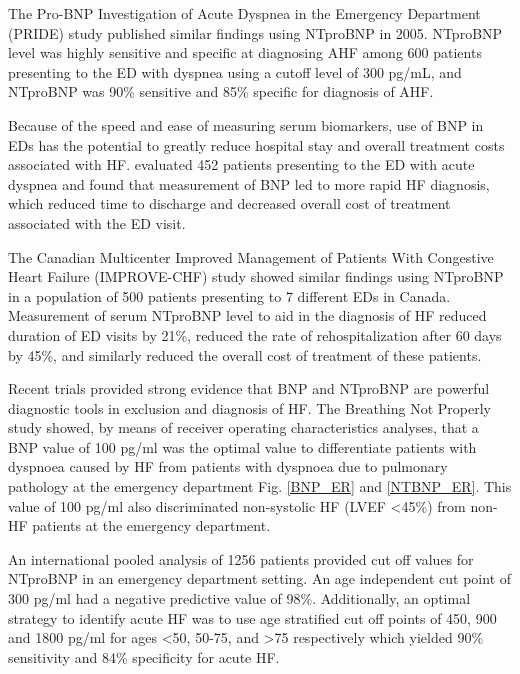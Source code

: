 \documentclass[14pt,a4paper,onecolumn]{extarticle}
\begin{document}
The Pro-BNP Investigation of Acute Dyspnea in the Emergency Department (PRIDE) study published similar findings using NTproBNP in 2005. NTproBNP level was highly sensitive and specific at diagnosing AHF among 600 patients presenting to the ED with dyspnea using a cutoff level of 300 pg/mL, and NTproBNP was 90\% sensitive and 85\% specific for diagnosis of AHF. \citep{Januzzi2005}  %

Because of the speed and ease of measuring serum biomarkers, use of BNP in EDs has the potential to greatly reduce hospital stay and overall treatment costs associated with HF. \citep{Mueller2004} evaluated 452 patients presenting to the ED with acute dyspnea and found that measurement of BNP led to more rapid HF diagnosis, which reduced time to discharge and decreased overall cost of treatment associated with the ED visit.  %

The Canadian Multicenter Improved Management of Patients With Congestive Heart Failure (IMPROVE-CHF) study showed similar findings using NTproBNP in a population of 500 patients presenting to 7 different EDs in Canada. Measurement of serum NTproBNP level to aid in the diagnosis of HF reduced duration of ED visits by 21\%, reduced the rate of rehospitalization after 60 days by 45\%, and similarly reduced the overall cost of treatment of these patients. \citep{Moe2007} %

Recent trials provided strong evidence that BNP and NTproBNP are powerful diagnostic tools in exclusion and diagnosis of HF. The Breathing Not Properly study showed, by means of receiver operating characteristics analyses, that a BNP value of 100 pg/ml was the optimal value to differentiate patients with dyspnoea caused by HF from patients with dyspnoea due to pulmonary pathology at the emergency department Fig. \ref{BNP_ER} and \ref{NTBNP_ER}.  This value of 100 pg/ml also discriminated non-systolic HF (LVEF <45\%) from non-HF patients at the emergency department. \citep{Maisel2002}

An international pooled analysis of 1256 patients provided cut off values for NTproBNP in an emergency department setting. An age independent cut point of 300 pg/ml had a negative predictive value of 98\%.  Additionally, an optimal strategy to identify acute HF was to use age stratified cut off points of 450, 900 and 1800 pg/ml for ages <50, 50-75, and >75 respectively which yielded 90\% sensitivity and 84\% specificity for acute HF. \citep{Januzzi2006a}
\end{document}
